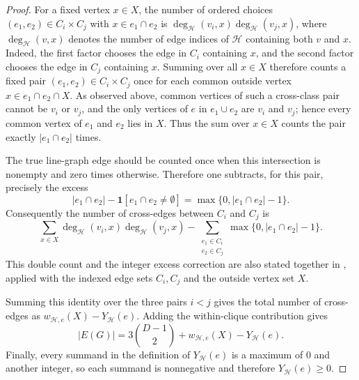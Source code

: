 \begin{proof}
For a fixed vertex $x\in X$, the number of ordered choices
$(e_1,e_2)\in C_i\times C_j$ with $x\in e_1\cap e_2$ is
$\deg_{\mathcal H}(v_i,x)\deg_{\mathcal H}(v_j,x)$, where
$\deg_{\mathcal H}(v,x)$ denotes the number of edge indices of
$\mathcal H$ containing both $v$ and $x$.  Indeed, the first factor chooses
the edge in $C_i$ containing $x$, and the second factor chooses the edge in
$C_j$ containing $x$.  Summing over all $x\in X$ therefore counts a fixed
pair $(e_1,e_2)\in C_i\times C_j$ once for each common outside vertex
$x\in e_1\cap e_2\cap X$.  As observed above, common vertices of such a
cross-class pair cannot be $v_i$ or $v_j$, and the only vertices of $e$ in
$e_1\cup e_2$ are $v_i$ and $v_j$; hence every common vertex of
$e_1$ and $e_2$ lies in $X$.  Thus the sum over $x\in X$ counts the pair
exactly $|e_1\cap e_2|$ times.

The true line-graph edge should be counted once when this intersection is
nonempty and zero times otherwise.  Therefore one subtracts, for this
pair, precisely the excess
\[
|e_1\cap e_2|-\mathbf 1[e_1\cap e_2\ne\emptyset]
=\max\{0,|e_1\cap e_2|-1\}.
\]
Consequently the number of cross-edges between $C_i$ and $C_j$ is
\[
\sum_{x\in X}\deg_{\mathcal H}(v_i,x)\deg_{\mathcal H}(v_j,x)
-
\sum_{\substack{e_1\in C_i\\ e_2\in C_j}}
\max\{0,|e_1\cap e_2|-1\}.
\]
This double count and the integer excess correction are also stated together
in , applied with the indexed
edge sets $C_i,C_j$ and the outside vertex set $X$.

Summing this identity over the three pairs $i<j$ gives the total number of
cross-edges as $w_{\mathcal H,e}(X)-Y_{\mathcal H}(e)$.  Adding the
within-clique contribution gives
\[
|E(G)|=3\binom{D-1}{2}+w_{\mathcal H,e}(X)-Y_{\mathcal H}(e).
\]
Finally, every summand in the definition of $Y_{\mathcal H}(e)$ is a maximum
of $0$ and another integer, so each summand is nonnegative and therefore
$Y_{\mathcal H}(e)\ge0$.
\end{proof}
